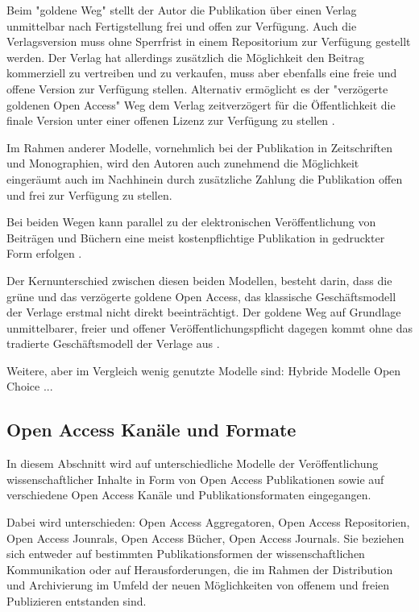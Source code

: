 Beim "goldene Weg" stellt der Autor die Publikation über einen Verlag unmittelbar nach Fertigstellung frei und offen zur Verfügung. Auch die Verlagsversion muss ohne Sperrfrist in einem Repositorium zur Verfügung gestellt werden. Der Verlag hat allerdings zusätzlich die Möglichkeit den Beitrag kommerziell zu vertreiben und zu verkaufen, muss aber ebenfalls eine freie und offene Version zur Verfügung stellen. Alternativ ermöglicht es der "verzögerte goldenen Open Access" Weg dem Verlag zeitverzögert für die Öffentlichkeit die finale Version unter einer offenen Lizenz zur Verfügung zu stellen \cite{lewis_2012_inevitability}. 

Im Rahmen anderer Modelle, vornehmlich bei der Publikation in Zeitschriften und Monographien, wird den Autoren auch zunehmend die Möglichkeit eingeräumt auch im Nachhinein durch zusätzliche Zahlung die Publikation offen und frei zur Verfügung zu stellen\cite{lewis_2012_inevitability}.

Bei beiden Wegen kann parallel zu der elektronischen Veröffentlichung von Beiträgen und Büchern eine meist kostenpflichtige Publikation in gedruckter Form erfolgen \cite{suchen}.

Der Kernunterschied zwischen diesen beiden Modellen, besteht darin, dass die grüne und das verzögerte goldene Open Access, das klassische Geschäftsmodell der Verlage erstmal nicht direkt beeinträchtigt. Der goldene Weg auf Grundlage unmittelbarer, freier und offener Veröffentlichungspflicht dagegen kommt ohne das tradierte Geschäftsmodell der Verlage aus \cite{lewis_2012_inevitability}.

Weitere, aber im Vergleich wenig genutzte Modelle sind:
Hybride Modelle
Open Choice \cite{Hess_2006} 
...

\subsection{Open Access Kanäle und Formate}
In diesem Abschnitt wird auf unterschiedliche Modelle der Veröffentlichung wissenschaftlicher Inhalte in Form von Open Access Publikationen sowie auf verschiedene Open Access Kanäle und Publikationsformaten eingegangen.

Dabei wird unterschieden: Open Access Aggregatoren, Open Access Repositorien, Open Access Jounrals, Open Access Bücher, Open Access Journals. Sie beziehen sich entweder auf bestimmten Publikationsformen der wissenschaftlichen Kommunikation oder auf Herausforderungen, die im Rahmen der Distribution und Archivierung im Umfeld der neuen Möglichkeiten von offenem und freien Publizieren entstanden sind. 

